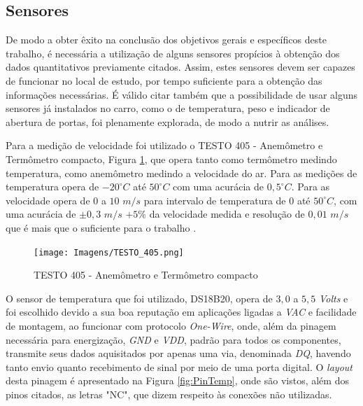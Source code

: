 \documentclass[acronym,symbols,table]{fei}
\begin{document}
\subsection{Sensores} \label{sensor}

De modo a obter êxito na conclusão dos objetivos gerais e específicos deste trabalho, é necessária a utilização de alguns sensores propícios à obtenção dos dados quantitativos previamente citados. %
Assim, estes sensores devem ser capazes de funcionar no local de estudo, por tempo suficiente para a obtenção das informações necessárias. É válido citar também que a possibilidade de usar alguns sensores já instalados no carro, como o de temperatura, peso e indicador de abertura de portas, foi plenamente explorada, de modo a nutrir as análises.

Para a medição de velocidade foi utilizado o TESTO 405 - Anemômetro e Termômetro compacto, Figura \ref{fig:TESTO_405}, que opera tanto como termômetro medindo temperatura, como anemômetro medindo a velocidade do ar. Para as medições de temperatura opera de ${-20} ^{\circ}C$ até ${50}^{\circ}C$ com uma acurácia de ${0,5}^{\circ}C$. Para as velocidade opera de ${0}$ a ${10}$ ${m/s}$ para intervalo de temperatura de ${0}$ até ${50} ^{\circ}C$, com uma acurácia de $\pm {0,3}$ ${m/s}$ $+{5}\%$ da velocidade medida e resolução de ${0,01}$ ${m/s}$ que é mais que o suficiente para o trabalho \cite{TESTO_405}.

\begin{figure}[!htb]
\centering
    \caption{TESTO 405 - Anemômetro e Termômetro compacto}
    \texttt{[image: Imagens/TESTO\_405.png]}
    \label{fig:TESTO_405}
\end{figure}


O sensor de temperatura que foi utilizado, DS18B20, opera de $3,0$ a $5,5$ \textit{Volts} e foi escolhido devido a sua boa reputação em aplicações ligadas a \textit{VAC} e facilidade de montagem, ao funcionar com protocolo \textit{One-Wire}, onde, além da pinagem necessária para energização, \textit{GND} e \textit{VDD},  padrão para todos os componentes, transmite seus dados aquisitados por apenas uma via, denominada \textit{DQ}, havendo tanto envio quanto recebimento de sinal por meio de uma porta digital.  O \textit{layout} desta pinagem é apresentado na Figura \ref{fig:PinTemp}, onde são vistos, além dos pinos citados, as letras "NC", que dizem respeito às conexões não utilizadas.
\end{document}
